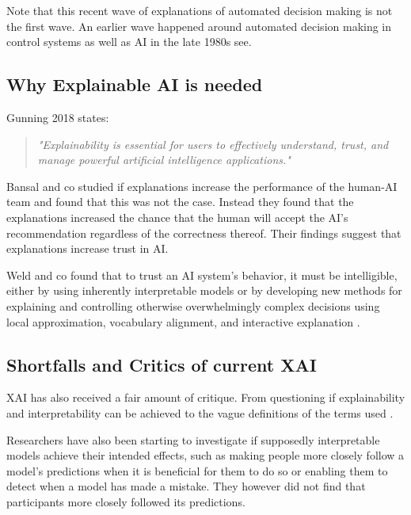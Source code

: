 \documentclass[manuscript,screen,review]{acmart}
\begin{document}
Note that this recent wave of explanations of automated decision making is not the first wave.
An earlier wave happened around automated decision making in control systems as well as AI in the late 1980s see\cite{Chandrasekaran1989}.

\subsection{Why Explainable AI is needed}\label{subsec:why-explainable-ai-is-needed}

Gunning 2018 states:
\begin{quote}
    \textit{"Explainability is essential for users to effectively understand, trust, and manage powerful artificial intelligence applications."}  \cite{Gunning2019}
\end{quote}

Bansal and co studied if explanations increase the performance of the human-AI team and found that this was not the case.
Instead they found that the explanations increased the chance that the human will accept the AI's recommendation regardless of the correctness thereof.
Their findings suggest that explanations increase trust in AI\cite{Bansal2020}.

Weld and co found that to trust an AI system's behavior, it must be intelligible, either by using inherently interpretable models or by developing new methods for explaining and controlling otherwise overwhelmingly complex decisions using local approximation, vocabulary alignment, and interactive explanation \cite{Weld2019}.


\subsection{Shortfalls and Critics of current XAI}\label{subsec:shortfalls-and-critics-of-current-xai}

XAI has also received a fair amount of critique.
From questioning if explainability and interpretability can be achieved to the vague definitions of the terms used \cite{Lipton2018}.

Researchers have also been starting to investigate if supposedly interpretable models achieve their intended effects, such as making people more closely follow a model's predictions when it is beneficial for them to do so or enabling them to detect when a model has made a mistake.
They however did not find that participants more closely followed its predictions\cite{Goldstein2021}.
\end{document}

